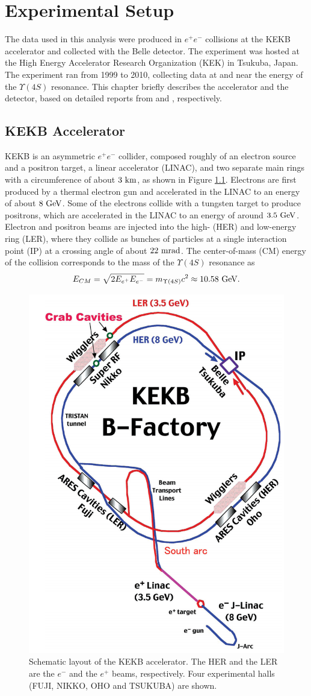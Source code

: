 \chapter{Experimental Setup}
The data used in this analysis were produced in $e^+e^-$ collisions at the KEKB accelerator and collected with the Belle detector. The experiment was hosted at the High Energy Accelerator Research Organization (KEK) in Tsukuba, Japan. The experiment ran from 1999 to 2010, collecting data at and near the energy of the $\Upsilon(4S)$ resonance. This chapter briefly describes the accelerator and the detector, based on detailed reports from \cite{doi:10.1093/ptep/pts102} and \cite{ABASHIAN2002117}, respectively.


\section{KEKB Accelerator}
KEKB is an asymmetric $e^+e^-$ collider, composed roughly of an electron source and a positron target, a linear accelerator (LINAC), and two separate main rings with a circumference of about $3\mathrm{~km}$, as shown in Figure \ref{fig:kekb}. Electrons are first produced by a thermal electron gun and accelerated in the LINAC to an energy of about $8\mathrm{~GeV}$. Some of the electrons collide with a tungsten target to produce positrons, which are accelerated in the LINAC to an energy of around $3.5\mathrm{~GeV}$. Electron and positron beams are injected into the high- (HER) and low-energy ring (LER), where they collide as bunches of particles at a single interaction point (IP) at a crossing angle of about $22\mathrm{~mrad}$. The center-of-mass (CM) energy of the collision corresponds to the mass of the $\Upsilon(4S)$ resonance as
\begin{equation}
E_{CM} = \sqrt{2E_{e^+}E_{e^-}} = m_{\Upsilon(4S)}c^2 \approx 10.58\mathrm{~GeV}.
\end{equation}

\begin{figure}[H]
	\centering
	\captionsetup{width=0.8\linewidth}
	\includegraphics[width=0.5\linewidth]{fig/setup/KEKB}
	\caption{Schematic layout of the KEKB accelerator. The HER and the LER are the $e^-$ and the $e^+$ beams, respectively. Four experimental halls (FUJI, NIKKO, OHO and TSUKUBA) are shown.}
	\label{fig:kekb}
\end{figure}

